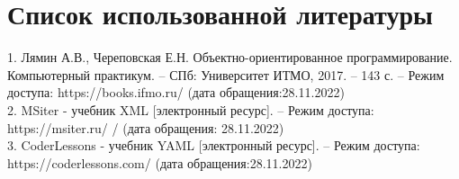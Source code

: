 \documentclass[12pt]{article}
\begin{document}
\section{Список использованной литературы}

1. Лямин А.В., Череповская Е.Н. Объектно-ориентированное 
программирование. Компьютерный практикум. – СПб: Университет 
ИТМО, 2017. – 143 с. – Режим доступа: https://books.ifmo.ru/ (дата обращения:28.11.2022)\\
2. MSiter - учебник XML [электронный ресурс]. – Режим доступа: https://msiter.ru/ / (дата обращения: 28.11.2022)\\
3. CoderLessons - учебник YAML [электронный ресурс]. – Режим доступа: https://coderlessons.com/ (дата обращения:28.11.2022)\\
\end{document}
